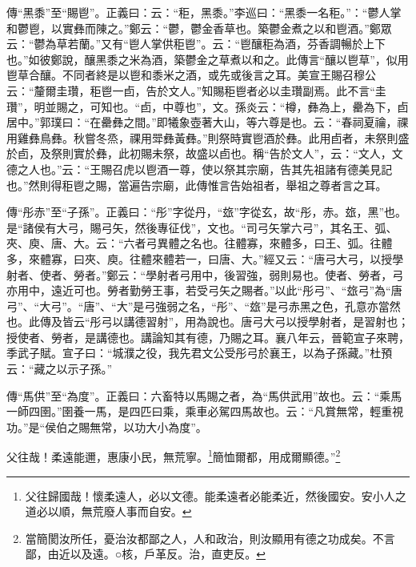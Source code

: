 {\noindent\zhuan{}\fzbyks 傳“黑黍”至“賜鬯”。正義曰：云：“秬，黑黍。”李巡曰：“黑黍一名秬。”：“鬱人掌和鬱鬯，以實彝而陳之。”鄭云：“鬱，鬱金香草也。築鬱金煮之以和鬯酒。”鄭眾云：“鬱為草若蘭。”又有“鬯人掌供秬鬯”。云：“鬯釀秬為酒，芬香調暢於上下也。”如彼鄭說，釀黑黍之米為酒，築鬱金之草煮以和之。此傳言“釀以鬯草”，似用鬯草合釀。不同者終是以鬯和黍米之酒，或先或後言之耳。美宣王賜召穆公云：“釐爾圭瓚，秬鬯一卣，告於文人。”知賜秬鬯者必以圭瓚副焉。此不言“圭瓚”，明並賜之，可知也。“卣，中尊也”，文。孫炎云：“樽，彝為上，罍為下，卣居中。”郭璞曰：“在罍彝之間。”即犧象壺著大山，等六尊是也。云：“春祠夏禴，祼用雞彝鳥彝。秋嘗冬烝，祼用斝彝黃彝。”則祭時實鬯酒於彝。此用卣者，未祭則盛於卣，及祭則實於彝，此初賜未祭，故盛以卣也。稱“告於文人”，云：“文人，文德之人也。”云：“王賜召虎以鬯酒一尊，使以祭其宗廟，告其先祖諸有德美見記也。”然則得秬鬯之賜，當遍告宗廟，此傳惟言告始祖者，舉祖之尊者言之耳。 \par}

{\noindent\zhuan{}\fzbyks 傳“彤赤”至“子孫”。正義曰：“彤”字從丹，“玈”字從玄，故“彤，赤。玈，黑”也。是“諸侯有大弓，賜弓矢，然後專征伐”，文也。“司弓矢掌六弓”，其名王、弧、夾、庾、唐、大。云：“六者弓異體之名也。往體寡，來體多，曰王、弧。往體多，來體寡，曰夾、庾。往體來體若一，曰唐、大。”經又云：“唐弓大弓，以授學射者、使者、勞者。”鄭云：“學射者弓用中，後習強，弱則易也。使者、勞者，弓亦用中，遠近可也。勞者勤勞王事，若受弓矢之賜者。”以此“彤弓”、“玈弓”為“唐弓”、“大弓”。“唐”、“大”是弓強弱之名，“彤”、“玈”是弓赤黑之色，孔意亦當然也。此傳及皆云“彤弓以講德習射”，用為說也。唐弓大弓以授學射者，是習射也；授使者、勞者，是講德也。講論知其有德，乃賜之耳。襄八年云，晉範宣子來聘，季武子賦。宣子曰：“城濮之役，我先君文公受彤弓於襄王，以為子孫藏。”杜預云：“藏之以示子孫。” \par}

{\noindent\zhuan{}\fzbyks 傳“馬供”至“為度”。正義曰：六畜特以馬賜之者，為“馬供武用”故也。云：“乘馬一師四圉。”圉養一馬，是四匹曰乘，乘車必駕四馬故也。云：“凡賞無常，輕重視功。”是“侯伯之賜無常，以功大小為度”。 \par}

父往哉！柔遠能邇，惠康小民，無荒寧。\footnote{父往歸國哉！懷柔遠人，必以文德。能柔遠者必能柔近，然後國安。安小人之道必以順，無荒廢人事而自安。}簡恤爾都，用成爾顯德。”\footnote{當簡閡汝所任，憂治汝都鄙之人，人和政治，則汝顯用有德之功成矣。不言鄙，由近以及遠。○核，戶革反。治，直吏反。}

